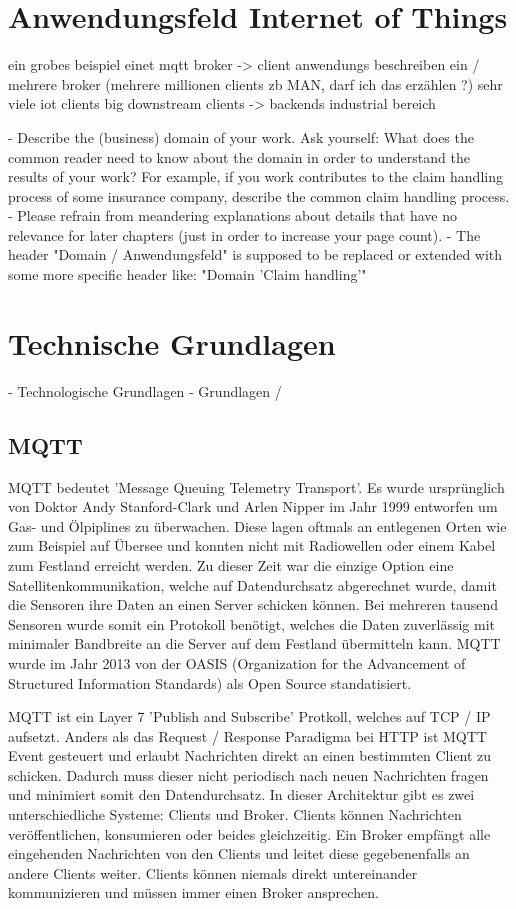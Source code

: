 \section{Anwendungsfeld Internet of Things}

ein grobes beispiel einet mqtt broker -> client anwendungs beschreiben
ein / mehrere broker (mehrere millionen clients zb MAN, darf ich das erzählen ?)
sehr viele iot clients
big downstream clients -> backends
industrial bereich

- Describe the (business) domain of your work. Ask yourself: What does the common reader need to know about the domain in order to understand the results of your work? For example, if you work contributes to the claim handling process of some insurance company, describe the common claim handling process.
- Please refrain from meandering explanations about details that have no relevance for later chapters (just in order to increase your page count).
- The header "Domain / Anwendungsfeld" is supposed to be replaced or extended with some more specific header like: "Domain 'Claim handling'"

\section{Technische Grundlagen} - Technologische Grundlagen - Grundlagen /

\subsection{MQTT}
MQTT bedeutet 'Message Queuing Telemetry Transport'. Es wurde ursprünglich von Doktor Andy Stanford-Clark und Arlen Nipper im Jahr 1999 entworfen um Gas- und Ölpiplines zu überwachen. Diese lagen oftmals an entlegenen Orten wie zum Beispiel auf Übersee und konnten nicht mit Radiowellen oder einem Kabel zum Festland erreicht werden. Zu dieser Zeit war die einzige Option eine Satellitenkommunikation, welche auf Datendurchsatz abgerechnet wurde, damit die Sensoren ihre Daten an einen Server schicken können. Bei mehreren tausend Sensoren wurde somit ein Protokoll benötigt, welches die Daten zuverlässig mit minimaler Bandbreite an die Server auf dem Festland übermitteln kann.
MQTT wurde im Jahr 2013 von der OASIS (Organization for the Advancement of Structured Information Standards) als Open Source standatisiert.

MQTT ist ein Layer 7 'Publish and Subscribe' Protkoll, welches auf TCP / IP aufsetzt. Anders als das Request / Response Paradigma bei HTTP ist MQTT Event gesteuert und erlaubt Nachrichten direkt an einen bestimmten Client zu schicken. Dadurch muss dieser nicht periodisch nach neuen Nachrichten fragen und minimiert somit den Datendurchsatz.
In dieser Architektur gibt es zwei unterschiedliche Systeme: Clients und Broker. Clients können Nachrichten veröffentlichen, konsumieren oder beides gleichzeitig.
Ein Broker empfängt alle eingehenden Nachrichten von den Clients und leitet diese gegebenenfalls an andere Clients weiter. Clients können niemals direkt untereinander kommunizieren und müssen immer einen Broker ansprechen.

